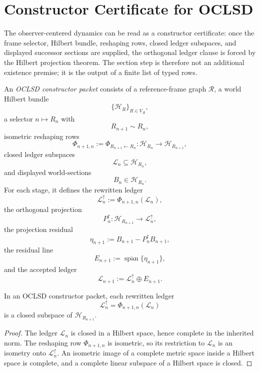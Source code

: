 \section{Constructor Certificate for OCLSD}
\label{sec:observer-centered-constructor-certificate}

The observer-centered dynamics can be read as a constructor certificate:
once the frame selector, Hilbert bundle, reshaping rows, closed ledger
subspaces, and displayed successor sections are supplied, the orthogonal
ledger clause is forced by the Hilbert projection theorem. The section
step is therefore not an additional existence premise; it is the output
of a finite list of typed rows.

\begin{definition}
\label{def:observer-centered-oclsd-constructor-packet}
An \emph{OCLSD constructor packet} consists of a reference-frame graph
$\mathcal R$, a world Hilbert bundle
$$
\{\mathcal H_R\}_{R\in V_{\mathcal R}},
$$
a selector $n\mapsto R_n$ with
$$
R_{n+1}\sim R_n,
$$
isometric reshaping rows
$$
\Phi_{n+1,n}:=\Phi_{R_{n+1}\leftarrow R_n}
:\mathcal H_{R_n}\to\mathcal H_{R_{n+1}},
$$
closed ledger subspaces
$$
\mathcal L_n\subseteq\mathcal H_{R_n},
$$
and displayed world-sections
$$
B_n\in\mathcal H_{R_n}.
$$
For each stage, it defines the rewritten ledger
$$
\mathcal L_n^{\uparrow}:=
\Phi_{n+1,n}(\mathcal L_n),
$$
the orthogonal projection
$$
P_n^{\uparrow}:
\mathcal H_{R_{n+1}}\to\mathcal L_n^{\uparrow},
$$
the projection residual
$$
\eta_{n+1}:=
B_{n+1}-P_n^{\uparrow}B_{n+1},
$$
the residual line
$$
E_{n+1}:=
\overline{\operatorname{span}}\{\eta_{n+1}\},
$$
and the accepted ledger
$$
\mathcal L_{n+1}:=
\mathcal L_n^{\uparrow}\oplus E_{n+1}.
$$
\end{definition}

\begin{lemma}
\label{lem:observer-centered-rewritten-ledger-closed}
In an OCLSD constructor packet, each rewritten ledger
$$
\mathcal L_n^{\uparrow}
=
\Phi_{n+1,n}(\mathcal L_n)
$$
is a closed subspace of $\mathcal H_{R_{n+1}}$.
\end{lemma}

\begin{proof}
The ledger $\mathcal L_n$ is closed in a Hilbert space, hence complete in
the inherited norm. The reshaping row $\Phi_{n+1,n}$ is isometric, so its
restriction to $\mathcal L_n$ is an isometry onto
$\mathcal L_n^{\uparrow}$. An isometric image of a complete metric space
inside a Hilbert space is complete, and a complete linear subspace of a
Hilbert space is closed.
\end{proof}

